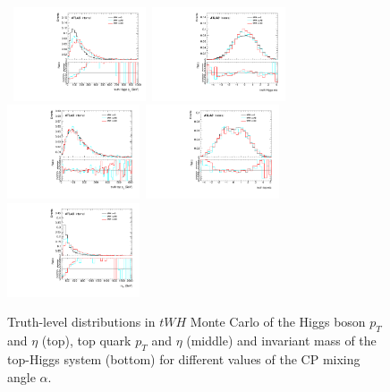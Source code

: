 \begin{figure}[!ht] 
  \begin{center}
    \mbox{ 
      \includegraphics[width=0.35\textwidth]{figures/tthcp_chapter/observables/tWH/c_H_pt.pdf}
      \includegraphics[width=0.35\textwidth]{figures/tthcp_chapter/observables/tWH/c_H_eta.pdf}
    }
    \mbox{ 
      \includegraphics[width=0.35\textwidth]{figures/tthcp_chapter/observables/tWH/c_t_pt.pdf}
      \includegraphics[width=0.35\textwidth]{figures/tthcp_chapter/observables/tWH/c_t_eta.pdf}
    }
    \mbox{ 
      \includegraphics[width=0.35\textwidth]{figures/tthcp_chapter/observables/tWH/c_tH_m.pdf}
    }
  \end{center}
  \caption{Truth-level distributions in $tWH$ Monte Carlo of the Higgs boson $p_{T}$ and $\eta$ (top), top quark $p_{T}$ and $\eta$ (middle) and invariant mass of the top-Higgs system (bottom) for different values of the CP mixing angle $\alpha$.}
  \label{fig:tWH_truth}
\end{figure}
\clearpage


